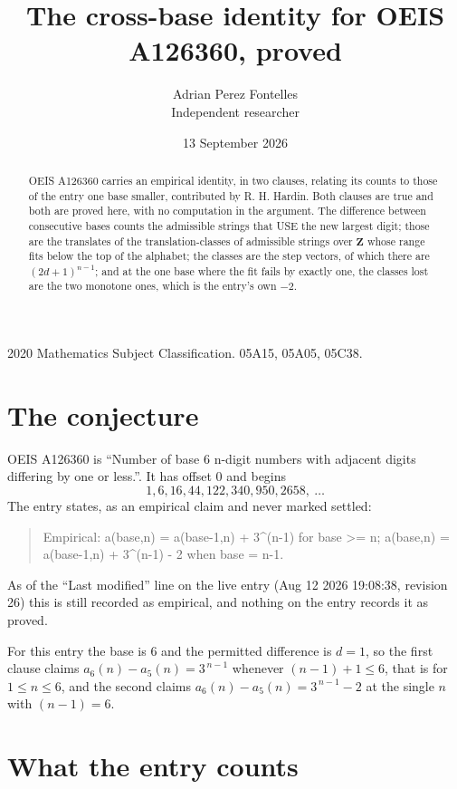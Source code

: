 \documentclass[11pt,a4paper]{article}
\title{The cross-base identity for OEIS A126360, proved}
\author{Adrian Perez Fontelles\\ \small Independent researcher}
\date{13 September 2026}
\theoremstyle{plain}
\theoremstyle{definition}
\begin{document}
\maketitle

\begin{abstract}
OEIS A126360 carries an empirical identity, in two clauses, relating its counts to those of the
entry one base smaller, contributed by R. H. Hardin. Both clauses are true and both are proved
here, with no computation in the argument. The difference between consecutive bases counts the
admissible strings that USE the new largest digit; those are the translates of the
translation-classes of admissible strings over $\mathbf{Z}$ whose range fits below the top of
the alphabet; the classes are the step vectors, of which there are $(2d+1)^{n-1}$; and at the
one base where the fit fails by exactly one, the classes lost are the two monotone ones, which
is the entry's own $-2$.
\end{abstract}

\noindent\small 2020 Mathematics Subject Classification. 05A15, 05A05, 05C38.\normalsize

\section{The conjecture}

OEIS A126360 is ``Number of base 6 n-digit numbers with adjacent digits differing by one or less.''. It has offset $0$ and begins
\[
1, 6, 16, 44, 122, 340, 950, 2658,\ \dots
\]
The entry states, as an empirical claim and never marked settled:
\begin{quote}
Empirical: a(base,n) = a(base-1,n) + 3\textasciicircum{}(n-1) for base >= n; a(base,n) = a(base-1,n) + 3\textasciicircum{}(n-1) - 2 when base = n-1.
\end{quote}
As of the ``Last modified'' line on the live entry (Aug 12 2026 19:08:38, revision 26)
this is still recorded as empirical, and nothing on the entry records it as proved.

For this entry the base is $6$ and the permitted difference is $d=1$, so the first clause
claims $a_{6}(n)-a_{5}(n)=3^{\,n-1}$ whenever $(n-1)+1\le6$, that is for
$1\le n\le6$, and the second claims $a_{6}(n)-a_{5}(n)=3^{\,n-1}-2$ at the single
$n$ with $(n-1)=6$.

\section{What the entry counts}
\end{document}
